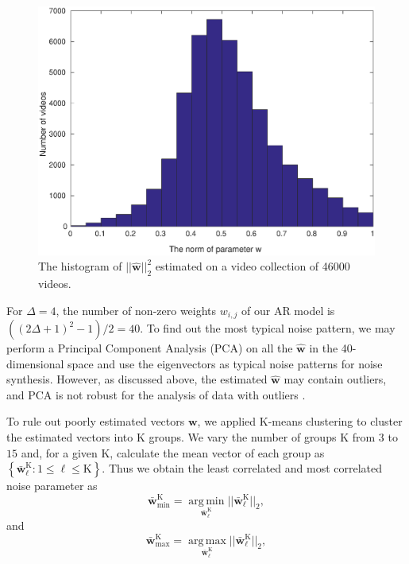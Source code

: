 \documentclass{sig-alternate}
\newcommand{\vect}[1]{\boldsymbol{#1}} %
\begin{document}
\begin{figure}[!hb]
	\centering
	\includegraphics[width=\columnwidth]{img/w2_hist_20.eps}
	\caption{\label{fig:w2_histogram} The histogram of $||\vect{\hat w}||_2^2$ estimated on a video collection of 46000 videos.}
\end{figure}

For $\Delta=4$, the number of non-zero weights $w_{i,j}$ of our AR model is $((2\Delta+1)^2-1)/2=40$. To find out the most typical noise pattern, we may perform a Principal Component Analysis (PCA) on all the $\vect{\hat w}$ in the 40-dimensional space and use the eigenvectors as typical noise patterns for noise synthesis. However, as discussed above, the estimated $\vect{\hat w}$ may contain outliers, and PCA is not robust for the analysis of data with outliers \cite{Bishop2006}. 

To rule out poorly estimated vectors $\vect{w}$, we applied K-means clustering \cite{kmeans} to cluster the estimated vectors into  $\mathrm{K}$ groups. We vary the number of groups $\mathrm{K}$ from $3$ to $15$ and, for a given $\mathrm{K}$, calculate the mean vector of each group as $\left\{\vect{\bar w}^\mathrm{K}_\ell: 1\leq\ell\leq\mathrm{K}\right\}$. Thus we obtain the least correlated and most correlated noise parameter as
\begin{equation}
\vect{\bar w}^\mathrm{K}_\mathrm{min} = \operatorname*{arg\,min}_{\vect{\bar{w}}^\mathrm{K}_\ell}||\vect{\bar w}^\mathrm{K}_\ell||_2,
\end{equation}
and 
\begin{equation}
\vect{\bar w}^\mathrm{K}_\mathrm{max} = \operatorname*{arg\,max}_{\vect{\bar w}^\mathrm{K}_\ell}||\vect{\bar w}^\mathrm{K}_\ell||_2,
\end{equation}
\end{document}
